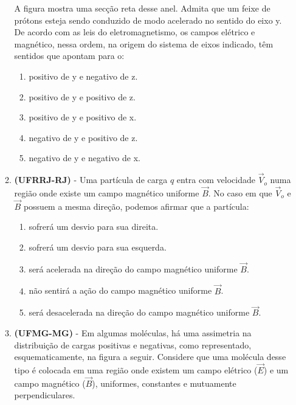 \documentclass[12pt,letterpaper,fleqn]{article}
\begin{document}
\begin{itemize}
\begin{enumerate}
            A figura mostra uma secção reta desse anel. Admita que um feixe de prótons esteja sendo conduzido de modo acelerado no sentido do eixo y. De acordo com as leis do eletromagnetismo, os campos elétrico e magnético, nessa ordem, na origem do sistema de eixos indicado, têm sentidos que apontam para o:
            
            \begin{enumerate}
                \item positivo de y e negativo de z. 
                \item positivo de y e positivo de z. 
                \item positivo de y e positivo de x.
                \item negativo de y e positivo de z.  
                \item negativo de y e negativo de x.
            \end{enumerate}
            
            \item \textbf{(UFRRJ-RJ)} - Uma partícula de carga $q$ entra com velocidade $\vec{V}_o$ numa região onde existe um campo magnético uniforme $\vec{B}$. No caso em que $\vec{V}_o$ e $\vec{B}$ possuem a mesma direção, podemos afirmar que a partícula:
            
            \begin{enumerate}
                \item sofrerá um desvio para sua direita.
                \item sofrerá um desvio para sua esquerda.
                \item será acelerada na direção do campo magnético uniforme $\vec{B}$.
                \item não sentirá a ação do campo magnético uniforme $\vec{B}$.
                \item será desacelerada na direção do campo magnético uniforme $\vec{B}$.
            \end{enumerate}
            
            \item \textbf{(UFMG-MG)} - Em algumas moléculas, há uma assimetria na distribuição de cargas positivas e negativas, como representado, esquematicamente, na figura a seguir. 
            Considere que uma molécula desse tipo é colocada em uma região onde existem um campo elétrico ($\vec{E}$) e um campo magnético ($\vec{B}$), uniformes, constantes e mutuamente perpendiculares.
            

\end{enumerate}
\end{itemize}
\end{document}
